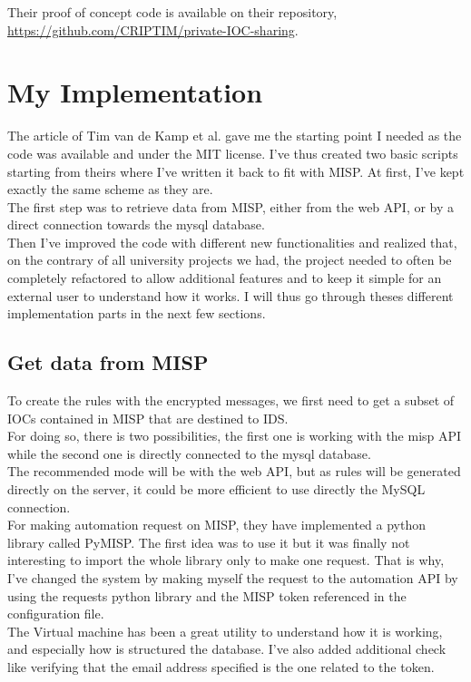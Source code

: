 \documentclass{eplmastersthesis}
\begin{document}
Their proof of concept code is available on their repository, \url{https://github.com/CRIPTIM/private-IOC-sharing}. 


\section{My Implementation}
The article of Tim van de Kamp et al. gave me the starting point I needed as the code was available and under the MIT license. I've thus created two basic scripts starting from theirs where I've written it back to fit with MISP. At first, I've kept exactly the same scheme as they are.\\
The first step was to retrieve data from MISP, either from the web API, or by a direct connection towards the mysql database.\\
Then I've improved the code with different new functionalities and realized that, on the contrary of all university projects we had, the project needed to often be completely refactored to allow additional features and to keep it simple for an external user to understand how it works. I will thus go through theses different implementation parts in the next few sections.\\

\subsection{Get data from MISP}
To create the rules with the encrypted messages, we first need to get a subset of IOCs contained in MISP that are destined to IDS. \\
For doing so, there is two possibilities, the first one is working with the misp API while the second one is directly connected to the mysql database. \\
The recommended mode will be with the web API, but as rules will be generated directly on the server, it could be more efficient to use directly the MySQL connection.\\

For making automation request on MISP, they have implemented a python library called PyMISP. The first idea was to use it but it was finally not interesting to import the whole library only to make one request. That is why, I've changed the system by making myself the request to the automation API by using the requests python library and the MISP token referenced in the configuration file.\\

The Virtual machine has been a great utility to understand how it is working, and especially how is structured the database. I've also added additional check like verifying that the email address specified is the one related to the token. 
\end{document}
